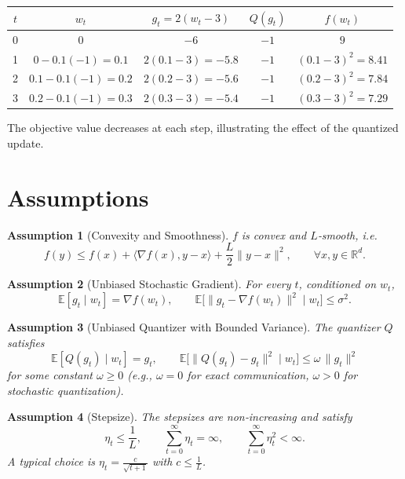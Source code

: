 \documentclass{article}
\newtheorem{assumption}{Assumption}
\begin{document}
\begin{center}
\begin{tabular}{c|c|c|c|c}
$t$ & $w_t$ & $g_t=2(w_t-3)$ & $Q(g_t)$ & $f(w_t)$ \\ \hline
0 & $0$ & $-6$ & $-1$ & $9$ \\
1 & $0-0.1(-1)=0.1$ & $2(0.1-3)=-5.8$ & $-1$ & $(0.1-3)^2=8.41$\\
2 & $0.1-0.1(-1)=0.2$ & $2(0.2-3)=-5.6$ & $-1$ & $(0.2-3)^2=7.84$\\
3 & $0.2-0.1(-1)=0.3$ & $2(0.3-3)=-5.4$ & $-1$ & $(0.3-3)^2=7.29$
\end{tabular}
\end{center}
The objective value decreases at each step, illustrating the effect of the quantized update.

\newpage
\section*{Assumptions}
\begin{assumption}[Convexity and Smoothness]\label{ass:convex}
$f$ is convex and $L$‑smooth, i.e.
\[
f(y)\le f(x)+\langle \nabla f(x),y-x\rangle+\frac{L}{2}\|y-x\|^2,\qquad\forall x,y\in\mathbb{R}^d .
\]
\end{assumption}

\begin{assumption}[Unbiased Stochastic Gradient]\label{ass:grad}
For every $t$, conditioned on $w_t$,
\[
\mathbb{E}[g_t\mid w_t]=\nabla f(w_t),\qquad 
\mathbb{E}\big[\|g_t-\nabla f(w_t)\|^2\mid w_t\big]\le\sigma^2 .
\]
\end{assumption}

\begin{assumption}[Unbiased Quantizer with Bounded Variance]\label{ass:quant}
The quantizer $Q$ satisfies
\[
\mathbb{E}[Q(g_t)\mid w_t]=g_t,
\qquad 
\mathbb{E}\!\big[\|Q(g_t)-g_t\|^2\mid w_t\big]\le \omega\,\|g_t\|^2
\]
for some constant $\omega\ge0$ (e.g., $\omega=0$ for exact communication, $\omega>0$ for stochastic quantization).
\end{assumption}

\begin{assumption}[Stepsize]\label{ass:steps}
The stepsizes are non‑increasing and satisfy
\[
\eta_t\le\frac{1}{L},\qquad \sum_{t=0}^{\infty}\eta_t =\infty,\qquad \sum_{t=0}^{\infty}\eta_t^{2}<\infty .
\]
A typical choice is $\eta_t=\frac{c}{\sqrt{t+1}}$ with $c\le\frac{1}{L}$.
\end{assumption}
\end{document}
